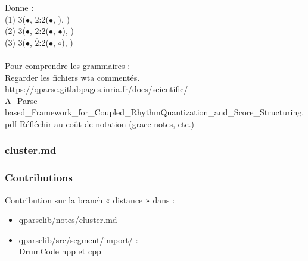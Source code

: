 Donne :\\
(1) 3($\bullet$, $\overline{2}$:2($\bullet$, ), )\\
(2) 3($\bullet$, $\overline{2}$:2($\bullet$, $\bullet$), )\\
(3) 3($\bullet$, $\overline{2}$:2($\bullet$, $\circ$), )\\\\


Pour comprendre les grammaires :\\
Regarder les fichiers wta commentés.\\
https://qparse.gitlabpages.inria.fr/docs/scientific/\\
A\_Parse-based\_Framework\_for\_Coupled\_RhythmQuantization\_and\_Score\_Structuring.pdf
Réfléchir au coût de notation (grace notes, etc.)
\newpage

\subsubsection{cluster.md}
%

\subsubsection{Contributions}
Contribution sur la branch « distance » dans :\\
\begin{itemize}
	\item qparselib/notes/cluster.md
	\item qparselib/src/segment/import/ :\\
	      DrumCode hpp et cpp\\
\end{itemize}
\newpage